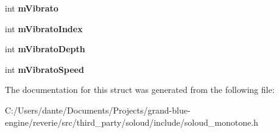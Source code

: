 \begin{DoxyCompactItemize}
\item 
\mbox{\label{struct_so_loud_1_1_monotone_channel_a3adecd373817c6e7b0ea7094afa2b1ce}} 
int {\bfseries m\+Vibrato}
\item 
\mbox{\label{struct_so_loud_1_1_monotone_channel_a94f4e3f3b0e29be984095096eb2dc8df}} 
int {\bfseries m\+Vibrato\+Index}
\item 
\mbox{\label{struct_so_loud_1_1_monotone_channel_a66ebdfe63337b787f05901eff3600170}} 
int {\bfseries m\+Vibrato\+Depth}
\item 
\mbox{\label{struct_so_loud_1_1_monotone_channel_adf9dce6bb6f6de8c898fe1dc56b7d367}} 
int {\bfseries m\+Vibrato\+Speed}
\end{DoxyCompactItemize}


The documentation for this struct was generated from the following file\+:\begin{DoxyCompactItemize}
\item 
C\+:/\+Users/dante/\+Documents/\+Projects/grand-\/blue-\/engine/reverie/src/third\+\_\+party/soloud/include/soloud\+\_\+monotone.\+h\end{DoxyCompactItemize}
